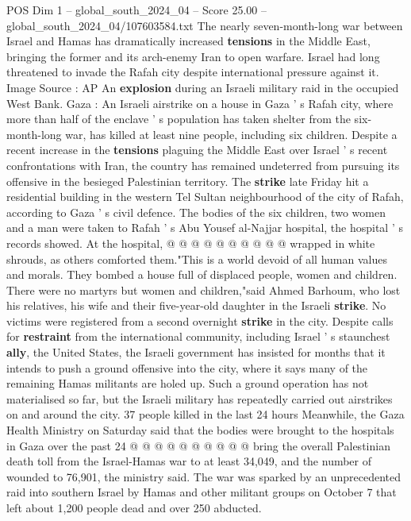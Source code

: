 \begin{textsample}{POS Dim 1 – global\_south\_2024\_04 – Score 25.00 – global\_south\_2024\_04/107603584.txt}  \label{ex:f1_pos_049}
The nearly seven-month-long war between Israel and Hamas has dramatically increased \textbf{tensions} in the Middle East, bringing the former and its arch-enemy Iran to open warfare.
Israel had long threatened to invade the Rafah city despite international pressure against it.
Image Source : AP An \textbf{explosion} during an Israeli military raid in the occupied West Bank.
Gaza : An Israeli airstrike on a house in Gaza ' s Rafah city, where more than half of the enclave ' s population has taken shelter from the six-month-long war, has killed at least nine people, including six children.
Despite a recent increase in the \textbf{tensions} plaguing the Middle East over Israel ' s recent confrontations with Iran, the country has remained undeterred from pursuing its offensive in the besieged Palestinian territory.
The \textbf{strike} late Friday hit a residential building in the western Tel Sultan neighbourhood of the city of Rafah, according to Gaza ' s civil defence.
The bodies of the six children, two women and a man were taken to Rafah ' s Abu Yousef al-Najjar hospital, the hospital ' s records showed.
At the hospital, @ @ @ @ @ @ @ @ @ @ wrapped in white shrouds, as others comforted them."This is a world devoid of all human values and morals.
They bombed a house full of displaced people, women and children.
There were no martyrs but women and children,"said Ahmed Barhoum, who lost his relatives, his wife and their five-year-old daughter in the Israeli \textbf{strike}.
No victims were registered from a second overnight \textbf{strike} in the city.
Despite calls for \textbf{restraint} from the international community, including Israel ' s staunchest \textbf{ally}, the United States, the Israeli government has insisted for months that it intends to push a ground offensive into the city, where it says many of the remaining Hamas militants are holed up.
Such a ground operation has not materialised so far, but the Israeli military has repeatedly carried out airstrikes on and around the city. 37 people killed in the last 24 hours Meanwhile, the Gaza Health Ministry on Saturday said that the bodies were brought to the hospitals in Gaza over the past 24 @ @ @ @ @ @ @ @ @ @ bring the overall Palestinian death toll from the Israel-Hamas war to at least 34,049, and the number of wounded to 76,901, the ministry said.
The war was sparked by an unprecedented raid into southern Israel by Hamas and other militant groups on October 7 that left about 1,200 people dead and over 250 abducted.

\end{textsample}
